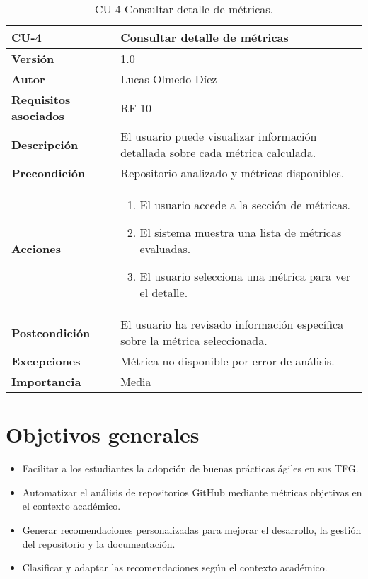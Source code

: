\begin{table}[p]
	\centering
	\begin{tabularx}{\linewidth}{ p{} p{} }
		\toprule
		\textbf{CU-4}    & Consultar detalle de métricas \\
		\toprule
		\textbf{Versión}              & 1.0 \\
		\textbf{Autor}                & Lucas Olmedo Díez \\
		\textbf{Requisitos asociados} & RF-10 \\
		\textbf{Descripción}          & El usuario puede visualizar información detallada sobre cada métrica calculada. \\
		\textbf{Precondición}         & Repositorio analizado y métricas disponibles. \\
		\textbf{Acciones}             &
		\begin{enumerate}
			\item El usuario accede a la sección de métricas.
			\item El sistema muestra una lista de métricas evaluadas.
			\item El usuario selecciona una métrica para ver el detalle.
		\end{enumerate}\\
		\textbf{Postcondición}        & El usuario ha revisado información específica sobre la métrica seleccionada. \\
		\textbf{Excepciones}          & Métrica no disponible por error de análisis. \\
		\textbf{Importancia}          & Media \\
		\bottomrule
	\end{tabularx}
	\caption{CU-4 Consultar detalle de métricas.}
\end{table}


\section{Objetivos generales}

\begin{itemize}
    \item Facilitar a los estudiantes la adopción de buenas prácticas ágiles en sus TFG.
    \item Automatizar el análisis de repositorios GitHub mediante métricas objetivas en el contexto académico.
    \item Generar recomendaciones personalizadas para mejorar el desarrollo, la gestión del repositorio y la documentación.
    \item Clasificar y adaptar las recomendaciones según el contexto académico.
\end{itemize}


